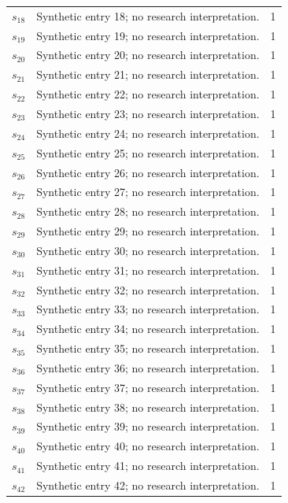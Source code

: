 \documentclass[11pt,a4paper]{article}
\begin{document}
\begin{longtable}{p{.15\linewidth}p{.55\linewidth}p{.15\linewidth}}
$s_{18}$ & Synthetic entry 18; no research interpretation. & 1 \\
$s_{19}$ & Synthetic entry 19; no research interpretation. & 1 \\
$s_{20}$ & Synthetic entry 20; no research interpretation. & 1 \\
$s_{21}$ & Synthetic entry 21; no research interpretation. & 1 \\
$s_{22}$ & Synthetic entry 22; no research interpretation. & 1 \\
$s_{23}$ & Synthetic entry 23; no research interpretation. & 1 \\
$s_{24}$ & Synthetic entry 24; no research interpretation. & 1 \\
$s_{25}$ & Synthetic entry 25; no research interpretation. & 1 \\
$s_{26}$ & Synthetic entry 26; no research interpretation. & 1 \\
$s_{27}$ & Synthetic entry 27; no research interpretation. & 1 \\
$s_{28}$ & Synthetic entry 28; no research interpretation. & 1 \\
$s_{29}$ & Synthetic entry 29; no research interpretation. & 1 \\
$s_{30}$ & Synthetic entry 30; no research interpretation. & 1 \\
$s_{31}$ & Synthetic entry 31; no research interpretation. & 1 \\
$s_{32}$ & Synthetic entry 32; no research interpretation. & 1 \\
$s_{33}$ & Synthetic entry 33; no research interpretation. & 1 \\
$s_{34}$ & Synthetic entry 34; no research interpretation. & 1 \\
$s_{35}$ & Synthetic entry 35; no research interpretation. & 1 \\
$s_{36}$ & Synthetic entry 36; no research interpretation. & 1 \\
$s_{37}$ & Synthetic entry 37; no research interpretation. & 1 \\
$s_{38}$ & Synthetic entry 38; no research interpretation. & 1 \\
$s_{39}$ & Synthetic entry 39; no research interpretation. & 1 \\
$s_{40}$ & Synthetic entry 40; no research interpretation. & 1 \\
$s_{41}$ & Synthetic entry 41; no research interpretation. & 1 \\
$s_{42}$ & Synthetic entry 42; no research interpretation. & 1 \\

\end{longtable}
\end{document}
